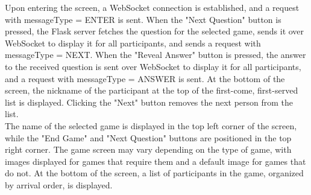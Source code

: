\documentclass[conference]{IEEEtran}
\begin{document}
        Upon entering the screen, a WebSocket connection is established, and a request with messageType = ENTER is sent. When the "Next Question" button is pressed, the Flask server fetches the question for the selected game, sends it over WebSocket to display it for all participants, and sends a request with messageType = NEXT. When the "Reveal Answer" button is pressed, the answer to the received question is sent over WebSocket to display it for all participants, and a request with messageType = ANSWER is sent. At the bottom of the screen, the nickname of the participant at the top of the first-come, first-served list is displayed. Clicking the "Next" button removes the next person from the list.\\
        The name of the selected game is displayed in the top left corner of the screen, while the "End Game" and "Next Question" buttons are positioned in the top right corner. The game screen may vary depending on the type of game, with images displayed for games that require them and a default image for games that do not. At the bottom of the screen, a list of participants in the game, organized by arrival order, is displayed.
\end{document}
